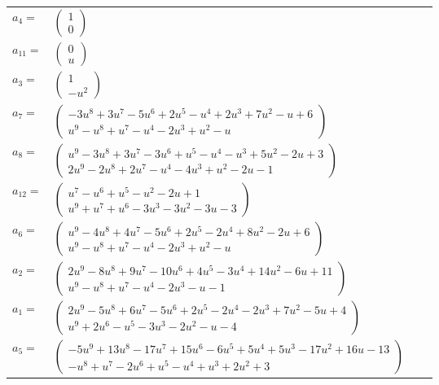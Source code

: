 \documentclass[1p]{elsarticle_modified}
\theoremstyle{definition}
\begin{document}
\begin{tabular}{m{7pt} m{180pt} m{7pt} m{180pt} }
\flushright $a_{4}=$&$\begin{pmatrix}1\\0\end{pmatrix}$ \\
\flushright $a_{11}=$&$\begin{pmatrix}0\\u\end{pmatrix}$ \\
\flushright $a_{3}=$&$\begin{pmatrix}1\\- u^2\end{pmatrix}$ \\
\flushright $a_{7}=$&$\begin{pmatrix}-3 u^8+3 u^7-5 u^6+2 u^5- u^4+2 u^3+7 u^2- u+6\\u^9- u^8+u^7- u^4-2 u^3+u^2- u\end{pmatrix}$ \\
\flushright $a_{8}=$&$\begin{pmatrix}u^9-3 u^8+3 u^7-3 u^6+u^5- u^4- u^3+5 u^2-2 u+3\\2 u^9-2 u^8+2 u^7- u^4-4 u^3+u^2-2 u-1\end{pmatrix}$ \\
\flushright $a_{12}=$&$\begin{pmatrix}u^7- u^6+u^5- u^2-2 u+1\\u^9+u^7+u^6-3 u^3-3 u^2-3 u-3\end{pmatrix}$ \\
\flushright $a_{6}=$&$\begin{pmatrix}u^9-4 u^8+4 u^7-5 u^6+2 u^5-2 u^4+8 u^2-2 u+6\\u^9- u^8+u^7- u^4-2 u^3+u^2- u\end{pmatrix}$ \\
\flushright $a_{2}=$&$\begin{pmatrix}2 u^9-8 u^8+9 u^7-10 u^6+4 u^5-3 u^4+14 u^2-6 u+11\\u^9- u^8+u^7- u^4-2 u^3- u-1\end{pmatrix}$ \\
\flushright $a_{1}=$&$\begin{pmatrix}2 u^9-5 u^8+6 u^7-5 u^6+2 u^5-2 u^4-2 u^3+7 u^2-5 u+4\\u^9+2 u^6- u^5-3 u^3-2 u^2- u-4\end{pmatrix}$ \\
\flushright $a_{5}=$&$\begin{pmatrix}-5 u^9+13 u^8-17 u^7+15 u^6-6 u^5+5 u^4+5 u^3-17 u^2+16 u-13\\- u^8+u^7-2 u^6+u^5- u^4+u^3+2 u^2+3\end{pmatrix}$ \\

\end{tabular}
\end{document}
